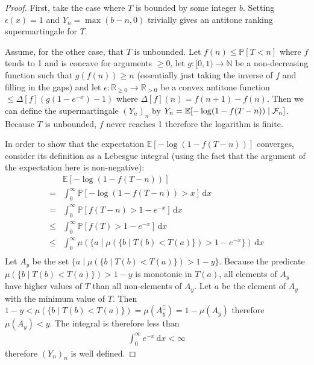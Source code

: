 \begin{proof}
First, take the case where $T$ is bounded by some integer $b$. Setting $\epsilon(x) = 1$ and $Y_n = \max(b-n, 0)$ trivially gives an antitone ranking supermartingale for $T$.

Assume, for the other case, that $T$ is unbounded. Let $f(n) \leq \mathbb P[T < n]$ where $f$ tends to 1 and is concave for arguments $\geq 0$, let $g : [0,1) \to \mathbb N$ be a non-decreasing function such that $g(f(n)) \geq n$ (essentially just taking the inverse of $f$ and filling in the gaps) and let $\epsilon : \mathbb R_{\geq 0} \to \mathbb R_{>0}$ be a convex antitone function $\leq \Delta[f](g(1-e^{-x})-1)$ where $\Delta[f](n) = f(n+1) - f(n)$. Then we can define the supermartingale $(Y_n)_n$ by $Y_n = \mathbb E[-\log(1-f(T-n)) \mid \mathcal{F}_n]$. Because $T$ is unbounded, $f$ never reaches 1 therefore the logarithm is finite.

In order to show that the expectation $\mathbb E[-\log(1-f(T-n))]$ converges, consider its definition as a Lebesgue integral (using the fact that the argument of the expectation here is non-negative):
\begin{align*}
& \mathbb E[-\log(1-f(T-n))] \\
= & \int_0^\infty \mathbb P[-\log(1-f(T-n)) > x] \, \mathrm d x \\
= & \int_0^\infty \mathbb P[f(T-n) > 1-e^{-x}] \, \mathrm d x \\
\leq & \int_0^\infty \mathbb P[f(T) > 1-e^{-x}] \, \mathrm d x \\
\leq & \int_0^\infty \mu(\{a \mid \mu(\{b \mid T(b) < T(a)\}) > 1-e^{-x}\}) \, \mathrm d x \\
\end{align*}
Let $A_y$ be the set $\{a \mid \mu(\{b \mid T(b) < T(a)\}) > 1-y\}$. Because the predicate $\mu(\{b \mid T(b) < T(a)\}) > 1-y$ is monotonic in $T(a)$, all elements of $A_y$ have higher values of $T$ than all non-elements of $A_y$. Let $a$ be the element of $A_y$ with the minimum value of $T$. Then $1-y < \mu(\{b \mid T(b) < T(a)\}) = \mu(A_y^\complement) = 1 - \mu(A_y)$ therefore $\mu(A_y) < y$. The integral is therefore less than
\begin{align*}
\int_0^\infty e^{-x} \, \mathrm d x < \infty
\end{align*}
therefore $(Y_n)_n$ is well defined.


\end{proof}
